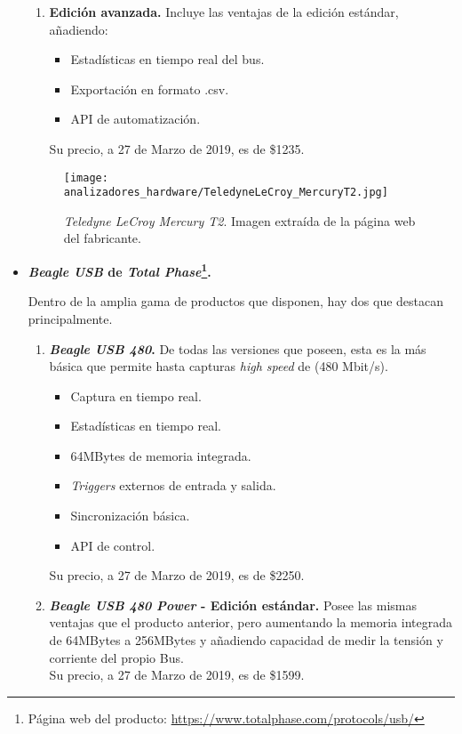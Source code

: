 \begin{itemize}
\begin{enumerate}
        \item \textbf{Edición avanzada.}
        Incluye las ventajas de la edición estándar, añadiendo:
        \begin{itemize}
            \item Estadísticas en tiempo real del bus.
            \item Exportación en formato .csv.
            \item API de automatización.
        \end{itemize}
        Su precio, a 27 de Marzo de 2019, es de \$1235.
    \end{enumerate}
    \begin{figure}[htb]
        \centering
        \texttt{[image: analizadores\_hardware/TeledyneLeCroy\_MercuryT2.jpg]}
        \caption{\emph{Teledyne LeCroy Mercury T2}. Imagen extraída de la página web del fabricante.}
        \label{fig:TeledyneLeCroy-MercuryT2}
    \end{figure}

    \item \textbf{\emph{Beagle USB} de \emph{Total Phase}\footnote{Página web del producto: \url{https://www.totalphase.com/protocols/usb/}}.}
    
    Dentro de la amplia gama de productos que disponen, hay dos que destacan principalmente.
    \begin{enumerate}
        \item \textbf{\emph{Beagle USB 480}\cite{totalphase12-2018}.}
        De todas las versiones que poseen, esta es la más básica que permite hasta capturas \emph{high speed} de (480 Mbit/s).
        \begin{itemize}
            \item Captura en tiempo real.
            \item Estadísticas en tiempo real.
            \item 64MBytes de memoria integrada.
            \item \emph{Triggers} externos de entrada y salida.
            \item Sincronización básica.
            \item API de control.
        \end{itemize}
        Su precio, a 27 de Marzo de 2019, es de \$2250.
        
        \item \textbf{\emph{Beagle USB 480 Power}\cite{totalphase480-2018} - Edición estándar.}
        Posee las mismas ventajas que el producto anterior, pero aumentando la memoria integrada de 64MBytes a 256MBytes y añadiendo capacidad de medir la tensión y corriente del propio Bus.\\
        Su precio, a 27 de Marzo de 2019, es de \$1599.
        

\end{enumerate}
\end{itemize}
